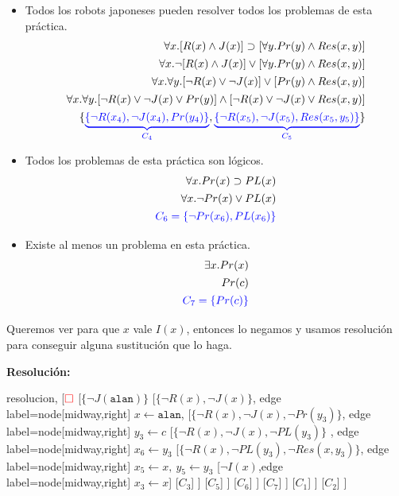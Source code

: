 \documentclass[10pt,a4paper]{article}
\begin{document}
\begin{itemize}
    \item Todos los robots japoneses pueden resolver todos los problemas de esta práctica.
        \begin{align*}
\forall x.[ R(x) \land J(x) ] \supset [\forall y. Pr(y) \land Res(x,y)] \\[1pt]
\forall x.\lnot[ R(x) \land J(x) ] \lor [\forall y. Pr(y) \land Res(x,y)] \\[1pt]
\forall x.\forall y.[\lnot R(x) \lor \lnot J(x) ] \lor [ Pr(y) \land Res(x,y)] \\[1pt]
\forall x.\forall y.[\lnot R(x) \lor \lnot J(x) \lor Pr(y) ] \land [ \lnot R(x) \lor \lnot J(x) \lor Res(x,y)] \\[1pt]
\{{\color{blue}\underbrace{\{\lnot R(x_4), \lnot J(x_4), Pr(y_4)\}}_{C_4}},{\color{blue}\underbrace{\{ \lnot R(x_5), \lnot J(x_5), Res(x_5,y_5)\}}_{C_5}}\}
       \end{align*}
\item Todos los problemas de esta práctica son lógicos.
\begin{align*}
\forall x. Pr(x) \supset PL(x) \\[1pt]
\forall x. \lnot Pr(x) \lor PL(x) \\[1pt]
{\color{blue}C_6 =\{\lnot Pr(x_6),PL(x_6)\}} \\[1pt]
\end{align*}
\item Existe al menos un problema en esta práctica.
\begin{align*}
\exists x. Pr(x) \\[1pt]
Pr(c) \\[1pt]
{\color{blue}C_7 = \{Pr(c)\}} \\[1pt]
\end{align*}
\end{itemize}
Queremos ver para que $x$ vale $I(x)$, entonces lo negamos y usamos resolución para conseguir alguna sustitución que lo haga.

\textbf{Resolución:}
\begin{center}
	\begin{forest} resolucion,
[${\color{red}\Box}$ 
	[$\{\lnot J(\texttt{alan})\}$
    	[$\{ \lnot R(x) \comma \lnot J(x)\}$, edge label={node[midway,right] {$x\leftarrow \texttt{alan}$}},
        	[$\{ \lnot R(x) \comma \lnot J(x) \comma \lnot Pr(y_3)\}$, edge label={node[midway,right] {$y_3\leftarrow c$}}
            	[$\{ \lnot R(x) \comma \lnot J(x) \comma \lnot PL(y_3)\}$
            	, edge label={node[midway,right] {$x_6\leftarrow y_3$}}
                	[$\{ \lnot R(x) \comma \lnot PL(y_3) \comma \lnot Res(x\comma y_3)\}$, edge label={node[midway,right] {$x_5\leftarrow x,~y_5\leftarrow y_3$}}
                    	[$\lnot I(x)$,edge label={node[midway,right] {$x_3\leftarrow x$}}]
                    	[$C_3$]
                	]
                	[$C_5$]
            	]
            	[$C_6$]
        	]
        	[$C_7$]
    	]
    	[$C_1$]
	]
	[$C_2$]
]
	\end{forest}
\end{center}
\end{document}
